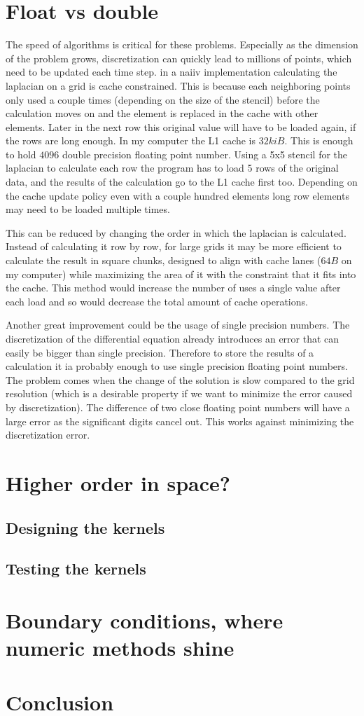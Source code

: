\documentclass[pdftex,12pt,a4paper]{article}
\begin{document}
	\section{Float vs double}
		The speed of algorithms is critical for these problems. Especially as the dimension of the problem grows, discretization can quickly lead to millions of points, which need to be updated each time step. in a naiiv implementation calculating the laplacian on a grid is cache constrained. This is because each neighboring points only used a couple times (depending on the size of the stencil) before the calculation moves on and the element is replaced in the cache with other elements. Later in the next row this original value will have to be loaded again, if the rows are long enough. In my computer the L1 cache is $32kiB$. This is enough to hold $4096$ double precision floating point number. Using a 5x5 stencil for the laplacian to calculate each row the program has to load 5 rows of the original data, and the results of the calculation go to the L1 cache first too. Depending on the cache update policy even with a couple hundred elements long row elements may need to be loaded multiple times.
		
		This can be reduced by changing the order in which the laplacian is calculated. Instead of calculating it row by row, for large grids it may be more efficient to calculate the result in square chunks, designed to align with cache lanes ($64B$ on my computer) while maximizing the area of it with the constraint that it fits into the cache. This method would increase the number of uses a single value after each load and so would decrease the total amount of cache operations.
		
		Another great improvement could be the usage of single precision numbers. The discretization of the differential equation already introduces an error that can easily be bigger than single precision. Therefore to store the results of a calculation it ia probably enough to use single precision floating point numbers. The problem comes when the change of the solution is slow compared to the grid resolution (which is a desirable property if we want to minimize the error caused by discretization). The difference of two close floating point numbers will have a large error as the significant digits cancel out. This works against minimizing the discretization error. 
	\section{Higher order in space?}
		
	\subsection{Designing the kernels}
		
	\subsection{Testing the kernels}
		
	\section{Boundary conditions, where numeric methods shine}
		
	\section{Conclusion}
		
	
    
\end{document}
